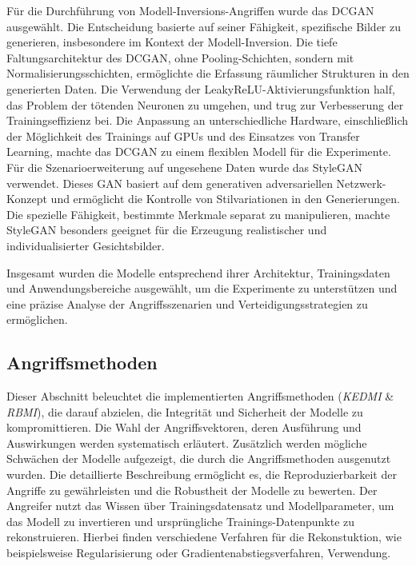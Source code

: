 Für die Durchführung von Modell-Inversions-Angriffen wurde das DCGAN ausgewählt. Die Entscheidung basierte auf seiner Fähigkeit, spezifische Bilder zu generieren, insbesondere im Kontext der Modell-Inversion. Die tiefe Faltungsarchitektur des DCGAN, ohne Pooling-Schichten, sondern mit Normalisierungsschichten, ermöglichte die Erfassung räumlicher Strukturen in den generierten Daten. Die Verwendung der LeakyReLU-Aktivierungsfunktion half, das Problem der \glqq tötenden Neuronen\grqq{} zu umgehen, und trug zur Verbesserung der Trainingseffizienz bei. Die Anpassung an unterschiedliche Hardware, einschließlich der Möglichkeit des Trainings auf GPUs und des Einsatzes von Transfer Learning, machte das DCGAN zu einem flexiblen Modell für die Experimente. Für die Szenarioerweiterung auf ungesehene Daten wurde das StyleGAN verwendet. Dieses GAN basiert auf dem generativen adversariellen Netzwerk-Konzept und ermöglicht die Kontrolle von Stilvariationen in den Generierungen. Die spezielle Fähigkeit, bestimmte Merkmale separat zu manipulieren, machte StyleGAN besonders geeignet für die Erzeugung realistischer und individualisierter Gesichtsbilder.

Insgesamt wurden die Modelle entsprechend ihrer Architektur, Trainingsdaten und Anwendungsbereiche ausgewählt, um die Experimente zu unterstützen und eine präzise Analyse der Angriffsszenarien und Verteidigungsstrategien zu ermöglichen.
\subsection{Angriffsmethoden}
Dieser Abschnitt beleuchtet die implementierten Angriffsmethoden (\textit{KEDMI} \& \textit{RBMI}), die darauf abzielen, die Integrität und Sicherheit der Modelle zu kompromittieren. Die Wahl der Angriffsvektoren, deren Ausführung und Auswirkungen werden systematisch erläutert. Zusätzlich werden mögliche Schwächen der Modelle aufgezeigt, die durch die Angriffsmethoden ausgenutzt wurden. Die detaillierte Beschreibung ermöglicht es, die Reproduzierbarkeit der Angriffe zu gewährleisten und die Robustheit der Modelle zu bewerten. Der Angreifer nutzt das Wissen über Trainingsdatensatz und Modellparameter, um das Modell zu invertieren und ursprüngliche Trainings-Datenpunkte zu rekonstruieren. Hierbei finden verschiedene Verfahren für die Rekonstuktion, wie beispielsweise Regularisierung oder Gradientenabstiegsverfahren, Verwendung.

